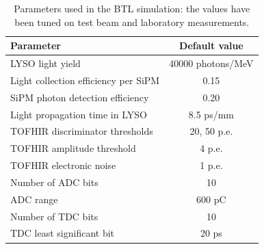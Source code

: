 \begin{table}
  \begin{center}  
    \begin{tabular}{ l | c }
      \hline
      Parameter & Default value \\
      \hline
      LYSO light yield                     & 40000 photons/MeV \\
      Light collection efficiency per SiPM & 0.15  \\ 
      SiPM photon detection efficiency     & 0.20  \\
      Light propagation time in LYSO       & 8.5 ps/mm \\
      \hline
      TOFHIR discriminator thresholds      & 20, 50 p.e. \\
      TOFHIR amplitude threshold           & 4 p.e. \\
      TOFHIR electronic noise              & 1 p.e. \\ 
      Number of ADC bits                   & 10 \\
      ADC range                            & 600 pC \\  
      Number of TDC bits                   & 10 \\
      TDC least significant bit            & 20 ps \\
    \hline
    \end{tabular}
    \caption{Parameters used in the BTL simulation: the values have been tuned on 
    test beam and laboratory measurements.
    \label{tab:sim_parameters}}
  \end{center}
\end{table}

